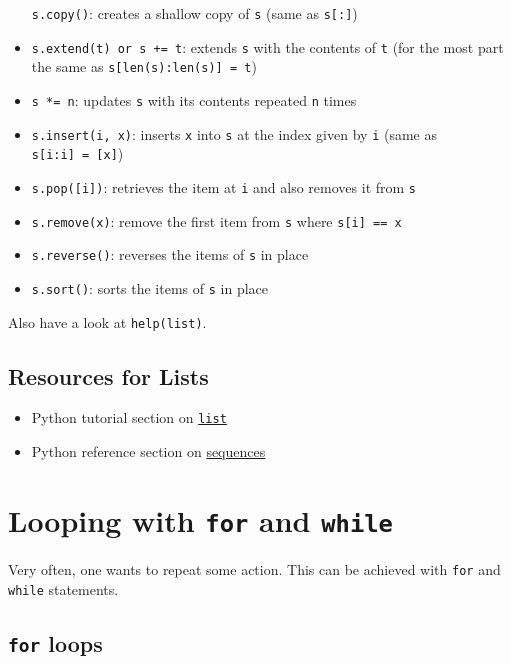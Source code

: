 \documentclass[12pt]{article} \newif\ifsolution\solutiontrue %
\begin{document}
\begin{itemize}
  \texttt{s.copy()}: creates a shallow copy of \texttt{s} (same as
  \texttt{s{[}:{]}})
\item
  \texttt{s.extend(t)\ or\ s\ +=\ t}: extends \texttt{s} with the
  contents of \texttt{t} (for the most part the same as
  \texttt{s{[}len(s):len(s){]}\ =\ t})
\item
  \texttt{s\ *=\ n}: updates \texttt{s} with its contents repeated
  \texttt{n} times
\item
  \texttt{s.insert(i,\ x)}: inserts \texttt{x} into \texttt{s} at the
  index given by \texttt{i} (same as \texttt{s{[}i:i{]}\ =\ {[}x{]}})
\item
  \texttt{s.pop({[}i{]})}: retrieves the item at \texttt{i} and also
  removes it from \texttt{s}
\item
  \texttt{s.remove(x)}: remove the first item from \texttt{s} where
  \texttt{s{[}i{]}\ ==\ x}
\item
  \texttt{s.reverse()}: reverses the items of \texttt{s} in place
\item
  \texttt{s.sort()}: sorts the items of \texttt{s} in place
\end{itemize}

Also have a look at \texttt{help(list)}.

\subsection{Resources for Lists}\label{resources}

\begin{itemize}
\item
  Python tutorial section on
  \href{https://docs.python.org/3/tutorial/introduction.html\#lists}{\texttt{list}}
\item
  Python reference section on
  \href{https://docs.python.org/3/library/stdtypes.html\#sequence-types-list-tuple-range}{sequences}
\end{itemize}


\section{\texorpdfstring{Looping with \texttt{for} and
\texttt{while}}{Looping with for and while}}\label{looping-with-for-and-while}

Very often, one wants to repeat some action. This can be achieved with
\texttt{for} and \texttt{while} statements.

\subsection{\texorpdfstring{\texttt{for}
loops}{for loops}}\label{for-loops}
\end{document}
